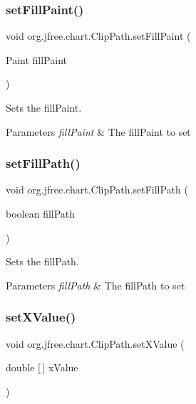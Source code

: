 \subsubsection{\texorpdfstring{set\+Fill\+Paint()}{setFillPaint()}}
{\footnotesize\ttfamily void org.\+jfree.\+chart.\+Clip\+Path.\+set\+Fill\+Paint (\begin{DoxyParamCaption}\item[{Paint}]{fill\+Paint }\end{DoxyParamCaption})}

Sets the fill\+Paint.


\begin{DoxyParams}{Parameters}
{\em fill\+Paint} & The fill\+Paint to set \\
\hline
\end{DoxyParams}
\mbox{\label{classorg_1_1jfree_1_1chart_1_1_clip_path_a6ca62840ceec1f54853dadd6a7cc69f1}} 
\subsubsection{\texorpdfstring{set\+Fill\+Path()}{setFillPath()}}
{\footnotesize\ttfamily void org.\+jfree.\+chart.\+Clip\+Path.\+set\+Fill\+Path (\begin{DoxyParamCaption}\item[{boolean}]{fill\+Path }\end{DoxyParamCaption})}

Sets the fill\+Path.


\begin{DoxyParams}{Parameters}
{\em fill\+Path} & The fill\+Path to set \\
\hline
\end{DoxyParams}
\mbox{\label{classorg_1_1jfree_1_1chart_1_1_clip_path_a5ca008b7be40dc7397ed8652e6e28fe2}} 
\subsubsection{\texorpdfstring{set\+X\+Value()}{setXValue()}}
{\footnotesize\ttfamily void org.\+jfree.\+chart.\+Clip\+Path.\+set\+X\+Value (\begin{DoxyParamCaption}\item[{double \mbox{[}$\,$\mbox{]}}]{x\+Value }\end{DoxyParamCaption})}

